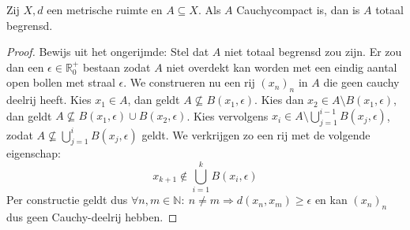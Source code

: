 \documentclass[main.tex]{subfiles}
\begin{document}
\begin{st}
  \label{st:cauchycompact-dan-totaal-begrensd}
  Zij $X,d$ een metrische ruimte en $A \subseteq X$.
  Als $A$ Cauchycompact is, dan is $A$ totaal begrensd.

  \begin{proof}
    Bewijs uit het ongerijmde: Stel dat $A$ niet totaal begrensd zou zijn.
    Er zou dan een $\epsilon \in \mathbb{R}_{0}^{+}$ bestaan zodat $A$ niet overdekt kan worden met een eindig aantal open bollen met straal $\epsilon$.
    We construeren nu een rij $(x_{n})_{n}$ in $A$ die geen cauchy deelrij heeft.
    Kies $x_{1}\in A$, dan geldt $A \not\subseteq B(x_{1},\epsilon)$.
    Kies dan $x_{2}\in A \setminus B(x_{1},\epsilon)$, dan geldt $A \not \subseteq B(x_{1},\epsilon) \cup B(x_{2},\epsilon)$.
    Kies vervolgens $x_{i}\in A\setminus \bigcup_{j=1}^{i-1}B(x_{j},\epsilon)$, zodat $A \not \subseteq \bigcup_{j=1}^{i}B(x_{j},\epsilon)$ geldt.
    We verkrijgen zo een rij met de volgende eigenschap:
    \[ x_{k+1} \not \in \bigcup_{i=1}^{k}B(x_{i},\epsilon) \]
    Per constructie geldt dus $\forall n,m\in \mathbb{N}:\ n\neq m \Rightarrow d(x_{n},x_{m}) \ge \epsilon$ en kan $(x_{n})_{n}$ dus geen Cauchy-deelrij hebben.
  \end{proof}
\end{st}
\end{document}
